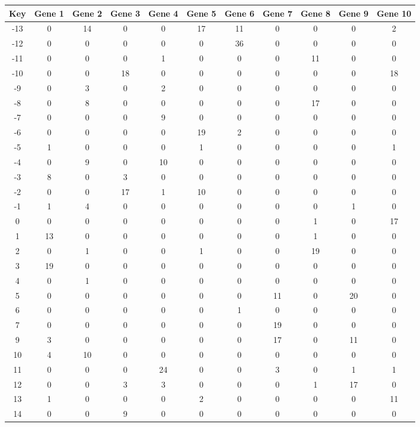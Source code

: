 \begin{tabular}{|c|c|c|c|c|c|c|c|c|c|c|}
\hline
Key & Gene 1 & Gene 2 & Gene 3 & Gene 4 & Gene 5 & Gene 6 & Gene 7 & Gene 8 & Gene 9 & Gene 10 \\
\hline
-13 & 0 & 14 & 0 & 0 & 17 & 11 & 0 & 0 & 0 & 2 \\
-12 & 0 & 0 & 0 & 0 & 0 & 36 & 0 & 0 & 0 & 0 \\
-11 & 0 & 0 & 0 & 1 & 0 & 0 & 0 & 11 & 0 & 0 \\
-10 & 0 & 0 & 18 & 0 & 0 & 0 & 0 & 0 & 0 & 18 \\
-9 & 0 & 3 & 0 & 2 & 0 & 0 & 0 & 0 & 0 & 0 \\
-8 & 0 & 8 & 0 & 0 & 0 & 0 & 0 & 17 & 0 & 0 \\
-7 & 0 & 0 & 0 & 9 & 0 & 0 & 0 & 0 & 0 & 0 \\
-6 & 0 & 0 & 0 & 0 & 19 & 2 & 0 & 0 & 0 & 0 \\
-5 & 1 & 0 & 0 & 0 & 1 & 0 & 0 & 0 & 0 & 1 \\
-4 & 0 & 9 & 0 & 10 & 0 & 0 & 0 & 0 & 0 & 0 \\
-3 & 8 & 0 & 3 & 0 & 0 & 0 & 0 & 0 & 0 & 0 \\
-2 & 0 & 0 & 17 & 1 & 10 & 0 & 0 & 0 & 0 & 0 \\
-1 & 1 & 4 & 0 & 0 & 0 & 0 & 0 & 0 & 1 & 0 \\
0 & 0 & 0 & 0 & 0 & 0 & 0 & 0 & 1 & 0 & 17 \\
1 & 13 & 0 & 0 & 0 & 0 & 0 & 0 & 1 & 0 & 0 \\
2 & 0 & 1 & 0 & 0 & 1 & 0 & 0 & 19 & 0 & 0 \\
3 & 19 & 0 & 0 & 0 & 0 & 0 & 0 & 0 & 0 & 0 \\
4 & 0 & 1 & 0 & 0 & 0 & 0 & 0 & 0 & 0 & 0 \\
5 & 0 & 0 & 0 & 0 & 0 & 0 & 11 & 0 & 20 & 0 \\
6 & 0 & 0 & 0 & 0 & 0 & 1 & 0 & 0 & 0 & 0 \\
7 & 0 & 0 & 0 & 0 & 0 & 0 & 19 & 0 & 0 & 0 \\
9 & 3 & 0 & 0 & 0 & 0 & 0 & 17 & 0 & 11 & 0 \\
10 & 4 & 10 & 0 & 0 & 0 & 0 & 0 & 0 & 0 & 0 \\
11 & 0 & 0 & 0 & 24 & 0 & 0 & 3 & 0 & 1 & 1 \\
12 & 0 & 0 & 3 & 3 & 0 & 0 & 0 & 1 & 17 & 0 \\
13 & 1 & 0 & 0 & 0 & 2 & 0 & 0 & 0 & 0 & 11 \\
14 & 0 & 0 & 9 & 0 & 0 & 0 & 0 & 0 & 0 & 0 \\
\hline
\end{tabular}
